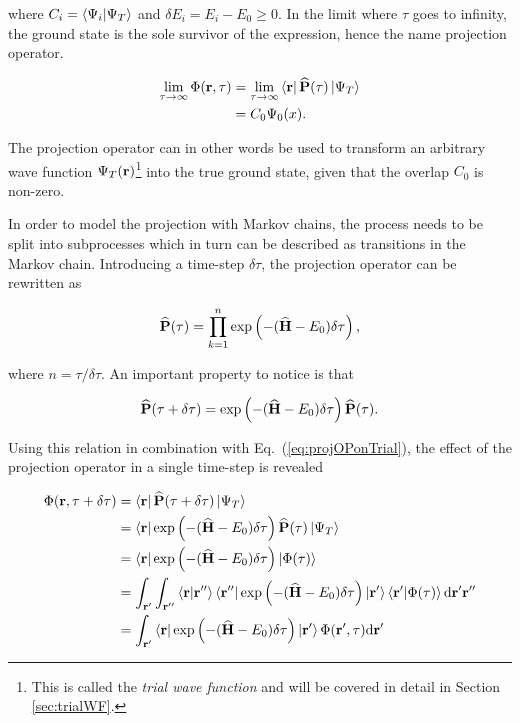 where $C_i = \left\langle \Psi_i | \Psi_T\right\rangle$ and $\delta E_i = E_i - E_0 \ge 0$. In the limit where $\tau$ goes to infinity, the ground state is the sole survivor of the expression, hence the name projection operator.

\begin{align}
 \lim_{\tau\to\infty}\Phi(\mathbf{r}, \tau) &=  \lim_{\tau\to\infty}\left< \mathbf{r} \right|{\bf\widehat{P}}(\tau)\left| \Psi_T \right>\notag \\
                           &= C_0\Psi_0(x).
\end{align}

The projection operator can in other words be used to transform an arbitrary wave function $\Psi_T(\mathbf{r})$\footnote{This is called the \textit{trial wave function} and will be covered in detail in Section \ref{sec:trialWF}.} into the true ground state, given that the overlap $C_0$ is non-zero.

In order to model the projection with Markov chains, the process needs to be split into subprocesses which in turn can be described as transitions in the Markov chain. Introducing a time-step $\delta\tau$, the projection operator can be rewritten as

\begin{equation}
 {\bf\widehat{P}}(\tau) = \prod_{k=1}^n \exp\left(-({\bf\widehat{H}} - E_0)\delta\tau\right),
\end{equation}

where $n = \tau/\delta\tau$. An important property to notice is that

\begin{equation}
 {\bf\widehat{P}}(\tau + \delta\tau) = \exp\left(-({\bf\widehat{H}} - E_0)\delta\tau\right){\bf\widehat{P}}(\tau).
\end{equation}

Using this relation in combination with Eq.~(\ref{eq:projOPonTrial}), the effect of the projection operator in a single time-step is revealed

\begin{align}
 \Phi(\mathbf{r}, \tau + \delta\tau) &= \left< \mathbf{r} \right|{\bf\widehat{P}}(\tau + \delta\tau)\left| \Psi_T \right> \notag \\
    &= \left< \mathbf{r} \right| \exp\left(-({\bf\widehat{H}} - E_0)\delta\tau\right){\bf\widehat{P}}(\tau)\left| \Psi_T \right> \notag \\
    &=  \left< \mathbf{r} \right| \exp\left(-({\bf\widehat{H}} - E_0)\delta\tau\right)\left| \Phi(\tau) \right> \notag \\
    &= \int_{\mathbf{r}'}\int_{\mathbf{r}''} \left\langle \mathbf{r} | \mathbf{r}''\right\rangle \left< \mathbf{r}'' \right|\exp\left(-({\bf\widehat{H}} - E_0)\delta\tau\right)\left| \mathbf{r}' \right>\left\langle \mathbf{r}' | \Phi(\tau)\right\rangle\mathrm{d}\mathbf{r}'\mathbf{r}'' \notag \\
    &= \int_{\mathbf{r}'}\left< \mathbf{r} \right|\exp\left(-({\bf\widehat{H}} - E_0)\delta\tau\right)\left| \mathbf{r}' \right>\Phi(\mathbf{r}', \tau)\mathrm{d}\mathbf{r}'
\end{align}

